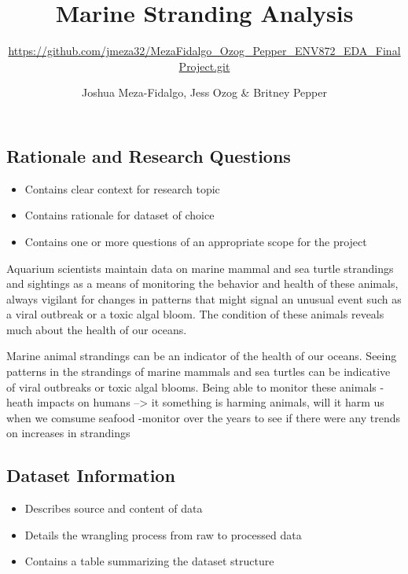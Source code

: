 \documentclass[
  12pt,
]{article}
\title{Marine Stranding Analysis}
\subtitle{\url{https://github.com/jmeza32/MezaFidalgo_Ozog_Pepper_ENV872_EDA_FinalProject.git}}
\author{Joshua Meza-Fidalgo, Jess Ozog \& Britney Pepper}
\date{}
\providecommand{\tightlist}{%
  \setlength{\itemsep}{0pt}\setlength{\parskip}{0pt}}
\begin{document}
\maketitle

\newpage
\tableofcontents 
\newpage
\listoftables 
\newpage
\listoffigures 
\newpage

\hypertarget{rationale-and-research-questions}{%
\subsection{Rationale and Research
Questions}\label{rationale-and-research-questions}}

\begin{itemize}
\tightlist
\item
  Contains clear context for research topic
\item
  Contains rationale for dataset of choice
\item
  Contains one or more questions of an appropriate scope for the project
\end{itemize}

Aquarium scientists maintain data on marine mammal and sea turtle
strandings and sightings as a means of monitoring the behavior and
health of these animals, always vigilant for changes in patterns that
might signal an unusual event such as a viral outbreak or a toxic algal
bloom. The condition of these animals reveals much about the health of
our oceans.

Marine animal strandings can be an indicator of the health of our
oceans. Seeing patterns in the strandings of marine mammals and sea
turtles can be indicative of viral outbreaks or toxic algal blooms.
Being able to monitor these animals -heath impacts on humans
--\textgreater{} it something is harming animals, will it harm us when
we comsume seafood -monitor over the years to see if there were any
trends on increases in strandings

\newpage

\hypertarget{dataset-information}{%
\subsection{Dataset Information}\label{dataset-information}}

\begin{itemize}
\tightlist
\item
  Describes source and content of data
\item
  Details the wrangling process from raw to processed data
\item
  Contains a table summarizing the dataset structure
\end{itemize}
\end{document}
